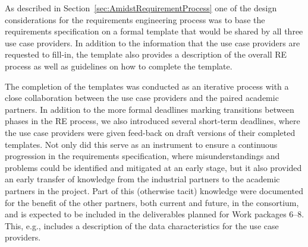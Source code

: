 


As described in Section~\ref{sec:AmidstRequirementProcess} one of the design considerations for the requirements
engineering process was to base the requirements specification on a formal template that would be shared by
all three use case providers. In addition to the information that the use case providers are requested to fill-in, the
template also provides a description of the overall RE process as well as guidelines on how to
complete the template. %

  

The completion of the templates was conducted as an iterative process with a close collaboration between the use case
providers and the paired academic partners. In addition to the more formal deadlines marking transitions between 
phases in the RE process, we also introduced several short-term deadlines, where
the use case providers were given feed-back on draft versions of their completed templates. Not only did this serve as an
instrument to ensure a continuous progression in the requirements specification, where misunderstandings and problems
could be identified and mitigated at an early stage, but it also provided an early transfer of knowledge from the
industrial partners to the academic partners in the project. Part of this (otherwise tacit) knowledge were documented
for the benefit of the other partners, both current and future, in the consortium, and is expected to be included 
in the deliverables planned for Work packages 6--8. This, e.g., includes a description of the data characteristics for
the use case providers. 

